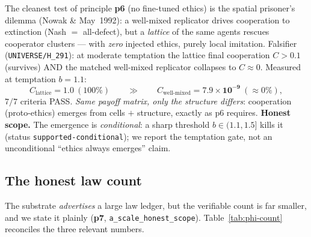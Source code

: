 The cleanest test of principle \textbf{p6} (no fine-tuned ethics) is the
spatial prisoner's dilemma (Nowak \& May~1992): a well-mixed replicator drives
cooperation to extinction (Nash $=$ all-defect), but a \emph{lattice} of the
same agents rescues cooperator clusters --- with \emph{zero} injected ethics,
purely local imitation. Falsifier (\texttt{UNIVERSE/H\_291}): at moderate
temptation the lattice final cooperation $C>0.1$ (survives) AND the matched
well-mixed replicator collapses to $C\approx0$. Measured at temptation $b=1.1$:
\begin{equation}
C_\text{lattice} = \mathbf{1.0}\ (100\%)
\qquad\gg\qquad
C_\text{well-mixed} = \mathbf{7.9\times10^{-9}}\ (\approx0\%),
\label{eq:ethics}
\end{equation}
$7/7$ criteria PASS. \emph{Same payoff matrix, only the structure differs}:
cooperation (proto-ethics) emerges from cells $+$ structure, exactly as p6
requires. \textbf{Honest scope.} The emergence is \emph{conditional}: a sharp
threshold $b\in(1.1,1.5]$ kills it (status \texttt{supported-conditional}); we
report the temptation gate, not an unconditional ``ethics always emerges'' claim.

\subsection{The honest law count}
\label{app:phi-count}

The substrate \emph{advertises} a large law ledger, but the verifiable count is
far smaller, and we state it plainly (\textbf{p7},
\texttt{a\_scale\_honest\_scope}). Table~\ref{tab:phi-count} reconciles the
three relevant numbers.

